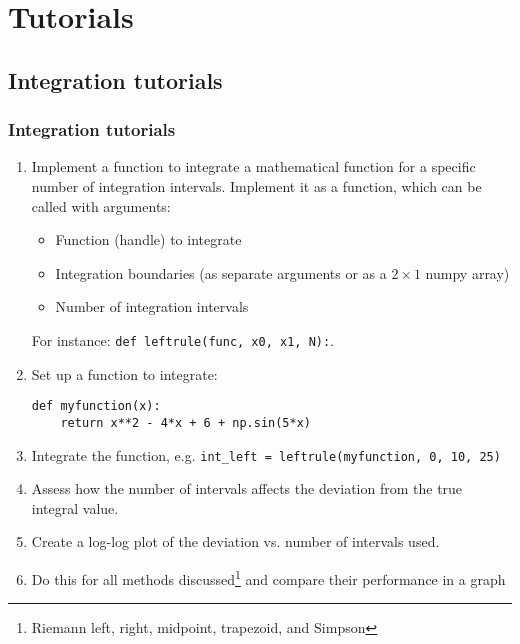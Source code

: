 \section{Tutorials}
\subsection*{Integration tutorials}
{\nologo
\begin{frame}[fragile]
  \frametitle{Integration tutorials}
  \begin{enumerate}
    \item Implement a function to integrate a mathematical function for a specific number of integration intervals. Implement it as a function, which can be called with arguments:
    \begin{itemize}
      \item Function (handle) to integrate
      \item Integration boundaries (as separate arguments or as a $2 \times 1$ numpy array)
      \item Number of integration intervals
    \end{itemize}
    For instance: \lstinline$def leftrule(func, x0, x1, N):$.\\
    \item Set up a function to integrate:
    \begin{lstlisting}
def myfunction(x):
    return x**2 - 4*x + 6 + np.sin(5*x)
    \end{lstlisting}
    \item Integrate the function, e.g. \lstinline$int_left = leftrule(myfunction, 0, 10, 25)$
    \item Assess how the number of intervals affects the deviation from the true integral value. 
    \item Create a log-log plot of the deviation vs. number of intervals used.
    \item Do this for all methods discussed\footnote{Riemann left, right, midpoint, trapezoid, and Simpson} and compare their performance in a graph
  \end{enumerate}
\end{frame}
}
